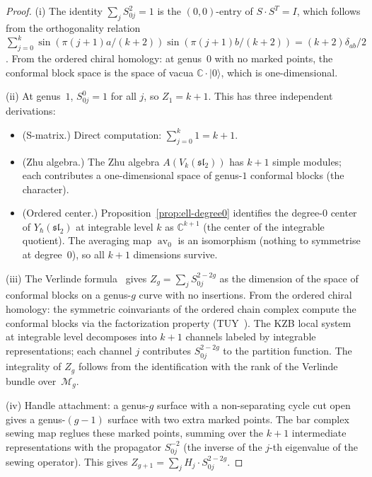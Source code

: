 \documentclass[11pt,reqno]{amsart}
\theoremstyle{definition}
\theoremstyle{remark}
\newcommand{\cM}{\mathcal{M}}
\DeclareMathOperator{\av}{av}
\newcommand{\CC}{\mathbb{C}}
\numberwithin{equation}{section}
\begin{document}
\begin{proof}
\textup{(i)} The identity $\sum_j S_{0j}^2 = 1$ is the
$(0,0)$-entry of $S \cdot S^T = I$, which follows from the
orthogonality relation
$\sum_{j=0}^{k} \sin(\pi(j{+}1)a/(k{+}2))
\sin(\pi(j{+}1)b/(k{+}2)) = (k{+}2)\delta_{ab}/2$.
From the ordered chiral homology: at genus~$0$ with no
marked points, the conformal block space is the space of
vacua $\CC \cdot |0\rangle$, which is one-dimensional.

\textup{(ii)} At genus~$1$, $S_{0j}^0 = 1$ for all $j$,
so $Z_1 = k + 1$. This has three independent derivations:
\begin{itemize}
\item \textup{(S-matrix.)} Direct computation:
  $\sum_{j=0}^{k} 1 = k + 1$.
\item \textup{(Zhu algebra.)} The Zhu algebra
  $A(V_k(\mathfrak{sl}_2))$ has $k+1$ simple modules;
  each contributes a one-dimensional space of genus-$1$
  conformal blocks (the character).
\item \textup{(Ordered center.)}
  Proposition~\ref{prop:ell-degree0} identifies the
  degree-$0$ center of $Y_\hbar(\mathfrak{sl}_2)$ at
  integrable level $k$ as $\CC^{k+1}$ (the center of
  the integrable quotient). The averaging map $\av_0$ is
  an isomorphism (nothing to symmetrise at degree~$0$),
  so all $k+1$ dimensions survive.
\end{itemize}

\textup{(iii)} The Verlinde formula~\cite{Verlinde88} gives
$Z_g = \sum_j S_{0j}^{2-2g}$ as the dimension of the space
of conformal blocks on a genus-$g$ curve with no insertions.
From the ordered chiral homology: the symmetric coinvariants
of the ordered chain complex compute the conformal blocks
via the factorization property (TUY~\cite{TUY89}). The
KZB local system at integrable level decomposes into $k+1$
channels labeled by integrable representations; each channel
$j$ contributes $S_{0j}^{2-2g}$ to the partition function.
The integrality of $Z_g$ follows from the identification
with the rank of the Verlinde bundle over~$\cM_g$.

\textup{(iv)} Handle attachment: a genus-$g$ surface with
a non-separating cycle cut open gives a genus-$(g{-}1)$
surface with two extra marked points. The bar complex sewing
map reglues these marked points, summing over the $k+1$
intermediate representations with the propagator
$S_{0j}^{-2}$ (the inverse of the $j$-th eigenvalue of
the sewing operator). This gives
$Z_{g+1} = \sum_j H_j \cdot S_{0j}^{2-2g}$.


\end{proof}
\end{document}
